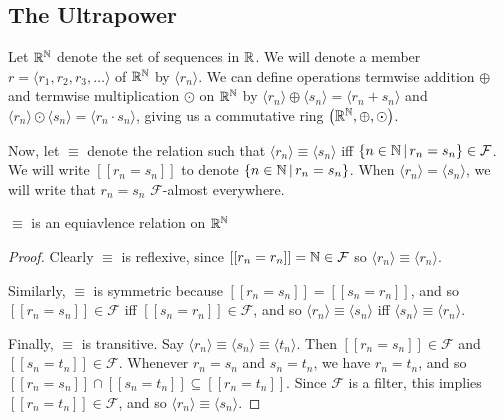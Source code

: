 \subsection{The Ultrapower}
Let $\mathbb{R}^{\mathbb{N}}$ denote the set of sequences in $\mathbb{R}$. We will denote a member $r = \langle r_1, r_2, r_3, \ldots \rangle$ of $\mathbb{R}^{\mathbb{N}}$ by $\langle r_n \rangle$. We can define operations termwise addition $\oplus$ and termwise multiplication $\odot$ on $\mathbb{R}^{\mathbb{N}}$ by $\langle r_n \rangle \oplus \langle s_n \rangle = \langle r_n + s_n \rangle$ and $\langle r_n \rangle \odot \langle s_n \rangle = \langle r_n \cdot s_n \rangle$, giving us a commutative ring $\left(\mathbb{R}^{\mathbb{N}}, \oplus, \odot\right)$.

Now, let $\equiv$ denote the relation such that $\langle r_n \rangle \equiv \langle s_n \rangle$ iff $\{n \in \mathbb{N} \,|\, r_n = s_n\} \in \mathcal{F}$. We will write $[[r_n = s_n]]$ to denote $\{n \in \mathbb{N} \,|\, r_n = s_n\}$. When $\langle r_n \rangle = \langle s_n \rangle$, we will write that $r_n = s_n$ $\mathcal{F}$-almost everywhere.

\begin{thm}
    $\equiv$ is an equiavlence relation on $\mathbb{R}^{\mathbb{N}}$
\end{thm}

\begin{proof}
    Clearly $\equiv$ is reflexive, since $[[r_n = r_n]] = \mathbb{N} \in \mathcal{F}$ so $\langle r_n \rangle \equiv \langle r_n \rangle$.
    
    Similarly, $\equiv$ is symmetric because $[[r_n = s_n]] = [[s_n = r_n]]$, and so $[[r_n = s_n]] \in \mathcal{F}$ iff $[[s_n = r_n]] \in \mathcal{F}$, and so $\langle r_n \rangle \equiv \langle s_n \rangle$ iff $\langle s_n \rangle \equiv \langle r_n \rangle$.

    Finally, $\equiv$ is transitive. Say $\langle r_n \rangle \equiv \langle s_n \rangle \equiv \langle t_n \rangle$. Then $[[r_n = s_n]] \in \mathcal{F}$ and $[[s_n = t_n]] \in \mathcal{F}$. Whenever $r_n = s_n$ and $s_n = t_n$, we have $r_n = t_n$, and so $[[r_n = s_n]] \cap [[s_n = t_n]] \subseteq [[r_n = t_n]]$. Since $\mathcal{F}$ is a filter, this implies $[[r_n = t_n]] \in \mathcal{F}$, and so $\langle r_n \rangle \equiv \langle s_n \rangle$.
\end{proof}

